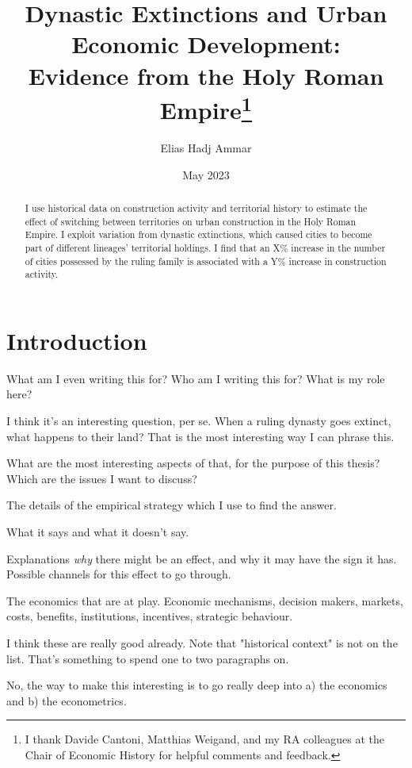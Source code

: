\documentclass{article}
\title{Dynastic Extinctions and Urban Economic Development: \\Evidence from the Holy Roman Empire\footnote{I thank Davide Cantoni, Matthias Weigand, and my RA colleagues at the Chair of Economic History for helpful comments and feedback.}
}
\author{Elias Hadj Ammar}
\date{May 2023}
\begin{document}
\onehalfspacing
\maketitle
\thispagestyle{empty}

\begin{abstract}
I use historical data on construction activity and territorial history to estimate the effect of switching between territories on urban construction in the Holy Roman Empire. I exploit variation from dynastic extinctions, which caused cities to become part of different lineages' territorial holdings. I find that an X\% increase in the number of cities possessed by the ruling family is associated with a Y\% increase in construction activity.
\end{abstract}




\newpage

\setcounter{page}{1}
\doublespacing

 
\section{Introduction}

What am I even writing this for?
Who am I writing this for?
What is my role here?

I think it's an interesting question, per se.
When a ruling dynasty goes extinct, what happens to their land?
That is the most interesting way I can phrase this.

What are the most interesting aspects of that, for the purpose of this thesis? Which are the issues I want to discuss?

The details of the empirical strategy which I use to find the answer.

What it says and what it doesn't say.

Explanations \textit{why} there might be an effect, and why it may have the sign it has. Possible channels for this effect to go through.

The economics that are at play. Economic mechanisms, decision makers, markets, costs, benefits, institutions, incentives, strategic behaviour.

I think these are really good already.
Note that "historical context" is not on the list.
That's something to spend one to two paragraphs on.

No, the way to make this interesting is to go really deep into a) the economics and b) the econometrics.
\end{document}
